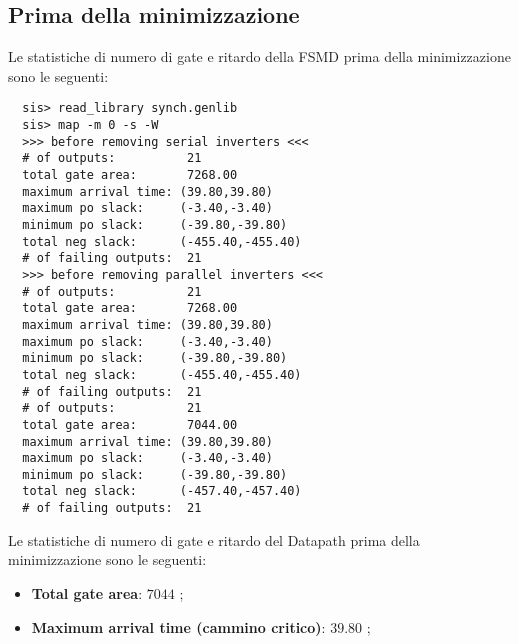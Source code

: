 \documentclass[a4paper]{article}
\begin{document}
\subsection{Prima della minimizzazione}
Le statistiche di numero di gate e ritardo della FSMD prima della minimizzazione sono le seguenti:
\vspace{1em}
\begin{lstlisting}
  sis> read_library synch.genlib
  sis> map -m 0 -s -W
  >>> before removing serial inverters <<<
  # of outputs:          21
  total gate area:       7268.00
  maximum arrival time: (39.80,39.80)
  maximum po slack:     (-3.40,-3.40)
  minimum po slack:     (-39.80,-39.80)
  total neg slack:      (-455.40,-455.40)
  # of failing outputs:  21
  >>> before removing parallel inverters <<<
  # of outputs:          21
  total gate area:       7268.00
  maximum arrival time: (39.80,39.80)
  maximum po slack:     (-3.40,-3.40)
  minimum po slack:     (-39.80,-39.80)
  total neg slack:      (-455.40,-455.40)
  # of failing outputs:  21
  # of outputs:          21
  total gate area:       7044.00
  maximum arrival time: (39.80,39.80)
  maximum po slack:     (-3.40,-3.40)
  minimum po slack:     (-39.80,-39.80)
  total neg slack:      (-457.40,-457.40)
  # of failing outputs:  21
\end{lstlisting}
\noindent Le statistiche di numero di gate e ritardo del Datapath prima della minimizzazione sono le seguenti:
\begin{itemize}
  \item \textbf{Total gate area}: \( 7044 \) ;
  \item \textbf{Maximum arrival time (cammino critico)}: \( 39.80 \) ;
\end{itemize}
\end{document}
